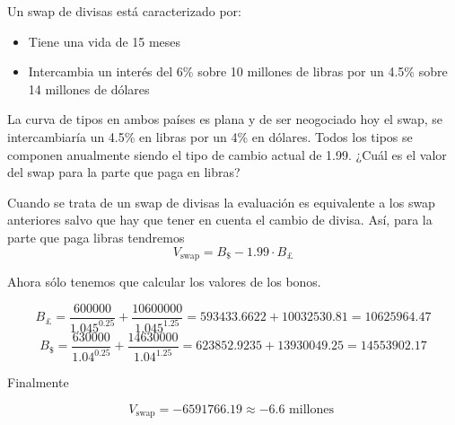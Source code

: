 \begin{problem}[4]
Un swap de divisas está caracterizado por:
\begin{itemize}
\item Tiene una vida de 15 meses
\item Intercambia un interés del 6\% sobre 10 millones de libras por un 4.5\% sobre 14 millones de dólares
\end{itemize}

La curva de tipos en ambos países es plana y de ser neogociado hoy el swap, se intercambiaría un 4.5\% en libras por un 4\% en dólares. Todos los tipos se componen anualmente siendo el tipo de cambio actual de 1.99. ¿Cuál es el valor del swap para la parte que paga en libras?

\solution
{}

Cuando se trata de un swap de divisas la evaluación es equivalente a los swap anteriores salvo que hay que tener en cuenta el cambio de divisa. Así, para la
parte que paga libras tendremos
\[V_{\text{swap}}=B_{\$}-1.99\cdot B_{\pounds}\]

Ahora sólo tenemos que calcular los valores de los bonos.

\[B_{\pounds} = \frac{600000}{1.045^{0.25}} + \frac{10600000}{1.045^{1.25}} = 593433.6622 + 10032530.81 = 10625964.47\]
\[B_{\$} = \frac{630000}{1.04^{0.25}} + \frac{14630000}{1.04^{1.25}} = 623852.9235 +13930049.25 = 14553902.17\]

Finalmente

\[V_{\text{swap}} = -6591766.19 \approx -6.6 \text{ millones }\]

\end{problem}

